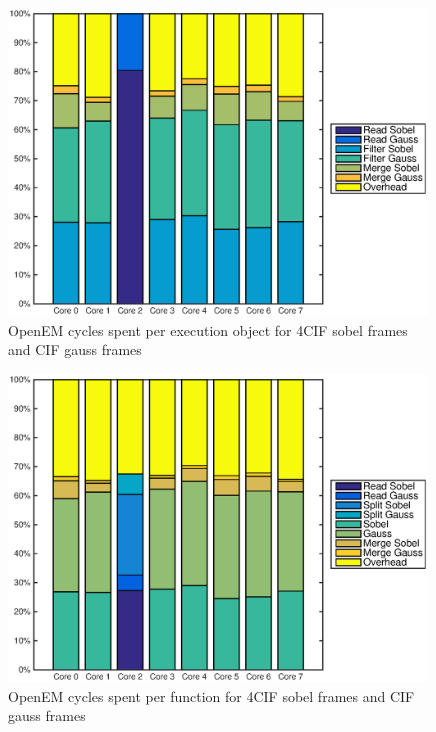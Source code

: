 \begin{figure}[h!]
    \begin{center}
        \includegraphics[width=0.99\textwidth]{images/openem_sobel4cif_gausscif_eo.eps}
        \caption{OpenEM cycles spent per execution object for 4CIF sobel frames and CIF gauss frames}
        \label{fig:oem8coreeosobel4cif}
    \end{center}
\end{figure}

\begin{figure}[h!]
    \begin{center}
        \includegraphics[width=0.99\textwidth]{images/openem_sobel4cif_gausscif_func.eps}
        \caption{OpenEM cycles spent per function for 4CIF sobel frames and CIF gauss frames}
        \label{fig:oem8corefuncsobel4cif}
    \end{center}
\end{figure}

